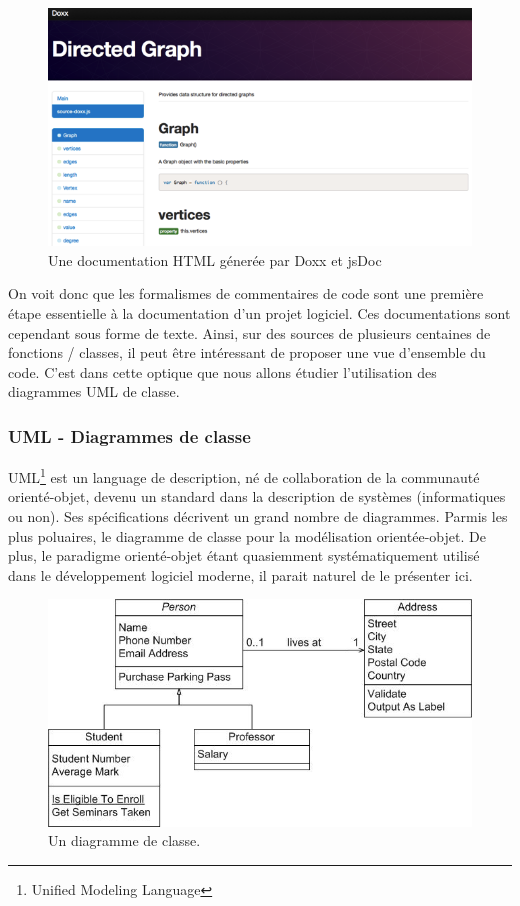 \begin{figure}[ht]
    \centering
    \includegraphics[scale=0.5]{./assets/doxx.png}
    \caption{Une documentation HTML génerée par Doxx et jsDoc}
\end{figure}

On voit donc que les formalismes de commentaires de code sont une première étape essentielle
à la documentation d'un projet logiciel. Ces documentations sont cependant sous forme de texte.
Ainsi, sur des sources de plusieurs centaines de fonctions / classes, il peut être intéressant de
proposer une vue d'ensemble du code. C'est dans cette optique que nous allons étudier l'utilisation
des diagrammes UML de classe.

    \subsubsection{UML - Diagrammes de classe}
UML\footnote{Unified Modeling Language} est un language de description, né de collaboration
de la communauté orienté-objet, devenu un standard dans la description de systèmes (informatiques ou non).
Ses spécifications décrivent un grand nombre de diagrammes. Parmis les plus poluaires, le diagramme
de classe pour la modélisation orientée-objet. De plus, le paradigme orienté-objet étant
quasiemment systématiquement utilisé dans le développement logiciel moderne, il parait naturel
de le présenter ici.

\begin{figure}[ht]
    \centering
    \includegraphics[scale=0.7]{./assets/class.jpg}
    \caption{Un diagramme de classe.}
\end{figure}

